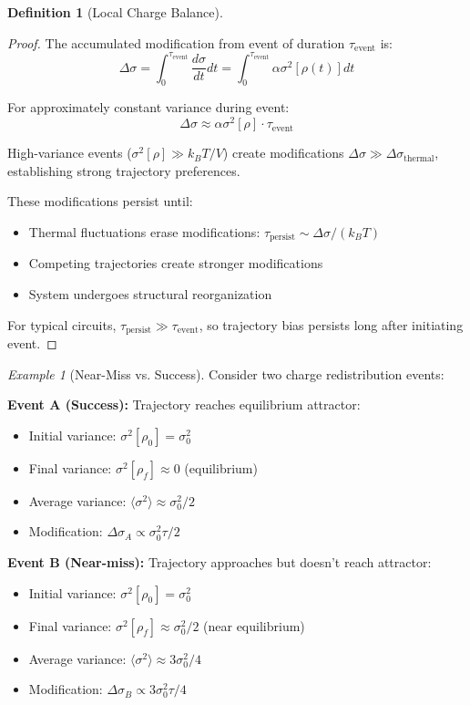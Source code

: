 \documentclass[12pt,a4paper]{article}
\theoremstyle{plain}
\theoremstyle{definition}
\newtheorem{definition}[theorem]{Definition}
\theoremstyle{remark}
\newtheorem{example}[theorem]{Example}
\begin{document}
\begin{definition}[Local Charge Balance]
\begin{proof}
The accumulated modification from event of duration $\tau_{\text{event}}$ is:
\begin{equation}
\Delta \sigma = \int_0^{\tau_{\text{event}}} \frac{d\sigma}{dt} dt = \int_0^{\tau_{\text{event}}} \alpha \sigma^2[\rho(t)] dt
\end{equation}

For approximately constant variance during event:
\begin{equation}
\Delta \sigma \approx \alpha \sigma^2[\rho] \cdot \tau_{\text{event}}
\end{equation}

High-variance events ($\sigma^2[\rho] \gg k_B T / V$) create modifications $\Delta \sigma \gg \Delta \sigma_{\text{thermal}}$, establishing strong trajectory preferences.

These modifications persist until:
\begin{itemize}
\item Thermal fluctuations erase modifications: $\tau_{\text{persist}} \sim \Delta \sigma / (k_B T)$
\item Competing trajectories create stronger modifications
\item System undergoes structural reorganization
\end{itemize}

For typical circuits, $\tau_{\text{persist}} \gg \tau_{\text{event}}$, so trajectory bias persists long after initiating event.
\end{proof}

\begin{example}[Near-Miss vs. Success]
\label{ex:near_miss}
Consider two charge redistribution events:

\textbf{Event A (Success):} Trajectory reaches equilibrium attractor:
\begin{itemize}
\item Initial variance: $\sigma^2[\rho_0] = \sigma_0^2$
\item Final variance: $\sigma^2[\rho_f] \approx 0$ (equilibrium)
\item Average variance: $\langle \sigma^2 \rangle \approx \sigma_0^2 / 2$
\item Modification: $\Delta \sigma_A \propto \sigma_0^2 \tau / 2$
\end{itemize}

\textbf{Event B (Near-miss):} Trajectory approaches but doesn't reach attractor:
\begin{itemize}
\item Initial variance: $\sigma^2[\rho_0] = \sigma_0^2$
\item Final variance: $\sigma^2[\rho_f] \approx \sigma_0^2 / 2$ (near equilibrium)
\item Average variance: $\langle \sigma^2 \rangle \approx 3\sigma_0^2 / 4$
\item Modification: $\Delta \sigma_B \propto 3\sigma_0^2 \tau / 4$
\end{itemize}


\end{example}
\end{definition}
\end{document}
